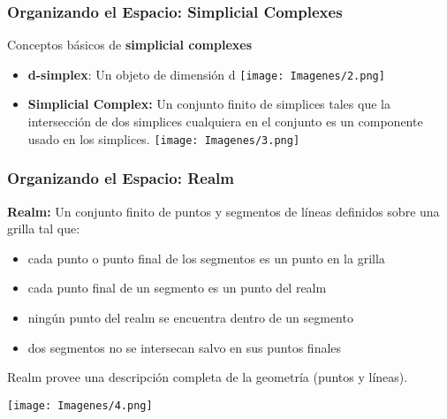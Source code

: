 \documentclass[12pt]{beamer}
\begin{document}
\begin{frame}
\frametitle{Organizando el Espacio: Simplicial Complexes}
Conceptos b\'asicos de \textbf{simplicial complexes}
\begin{itemize}
\item \textbf{d-simplex}: Un objeto de dimensi\'on d
\texttt{[image: Imagenes/2.png]}
\item \textbf{Simplicial Complex:} Un conjunto finito de simplices tales que la intersecci\'on de dos simplices cualquiera en el conjunto es un componente usado en los simplices.
\texttt{[image: Imagenes/3.png]}
\end{itemize}
\end{frame}

\begin{frame}
\frametitle{Organizando el Espacio: Realm}
\textbf{Realm:} Un conjunto finito de puntos y segmentos de l\'ineas definidos sobre una grilla tal que:
\begin{small}
\begin{itemize}
\item cada punto o punto final de los segmentos es un punto en la grilla
\item cada punto final de un segmento es un punto del realm
\item ning\'un punto del realm se encuentra dentro de un segmento
\item dos segmentos no se intersecan salvo en sus puntos finales
\end{itemize}
\end{small}
Realm provee una descripci\'on completa de la geometr\'ia (puntos y l\'ineas).\\
\begin{center}\texttt{[image: Imagenes/4.png]}\end{center}
\begin{small}
\end{small}
\end{frame}
\end{document}
